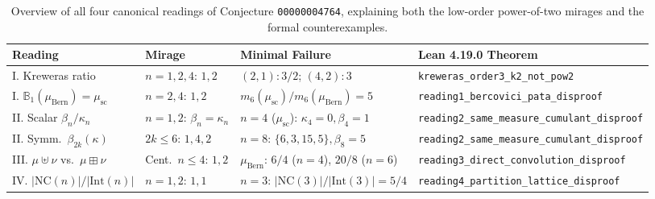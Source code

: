 \documentclass[11pt,a4paper]{article}
\theoremstyle{definition}
\theoremstyle{remark}
\newcommand{\NC}{\mathrm{NC}}
\newcommand{\IntP}{\mathrm{Int}}
\newcommand{\BP}{\mathbb{B}_1}
\newcommand{\Bern}{\mu_{\mathrm{Bern}}}
\newcommand{\Wig}{\mu_{\mathrm{sc}}}
\begin{document}
\begin{table}[htbp]
\centering
\scriptsize
\renewcommand{\arraystretch}{1.28}
\setlength{\tabcolsep}{3pt}
\begin{tabular}{@{}llll@{}}
\hline
\textbf{Reading} & \textbf{Mirage} & \textbf{Minimal Failure} & \textbf{Lean 4.19.0 Theorem} \\
\hline
I. Kreweras ratio & $n=1,2,4$: $1, 2$ & $(2,1): 3/2$; $(4,2): 3$ & \texttt{kreweras\_order3\_k2\_not\_pow2} \\
I. $\BP(\Bern) = \Wig$ & $n = 2, 4$: $1, 2$ & $m_6(\Wig)/m_6(\Bern) = 5$ & \texttt{reading1\_bercovici\_pata\_disproof} \\
II. Scalar $\beta_n / \kappa_n$ & $n = 1, 2$: $\beta_n = \kappa_n$ & $n = 4$ ($\Wig$): $\kappa_4 = 0, \beta_4 = 1$ & \texttt{reading2\_same\_measure\_cumulant\_disproof} \\
II. Symm.\ $\beta_{2k}(\kappa)$ & $2k \le 6$: $1, 4, 2$ & $n = 8$: $\{6,3,15,5\}, \beta_8=5$ & \texttt{reading2\_same\_measure\_cumulant\_disproof} \\
III. $\mu \uplus \nu$ vs.\ $\mu \boxplus \nu$ & Cent.\ $n \le 4$: $1, 2$ & $\Bern$: $6/4$ ($n=4$), $20/8$ ($n=6$) & \texttt{reading3\_direct\_convolution\_disproof} \\
IV. $|\NC(n)| / |\IntP(n)|$ & $n = 1, 2$: $1, 1$ & $n = 3$: $|\NC(3)|/|\IntP(3)| = 5/4$ & \texttt{reading4\_partition\_lattice\_disproof} \\
\hline
\end{tabular}
\caption{Overview of all four canonical readings of Conjecture \texttt{00000004764}, explaining both the low-order power-of-two mirages and the formal counterexamples.}
\label{tab:summary}
\end{table}
\end{document}
